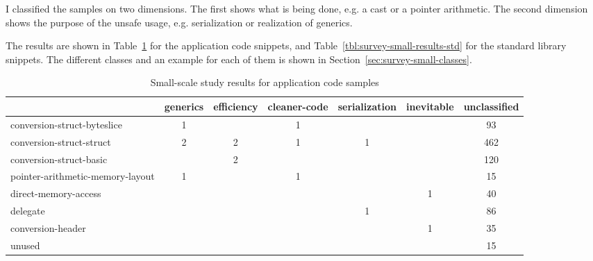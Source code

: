 I classified the samples on two dimensions.
The first shows what is being done, e.g. a cast or a pointer arithmetic.
The second dimension shows the purpose of the unsafe usage, e.g. serialization or realization of generics.

The results are shown in Table~\ref{tbl:survey-small-results-app} for the application code snippets, and
Table~\ref{tbl:survey-small-results-std} for the standard library snippets.
The different classes and an example for each of them is shown in Section~\ref{sec:survey-small-classes}.

\begin{table}[h]
    \centering
    \caption{Small-scale study results for application code samples}
    \label{tbl:survey-small-results-app}
    \begin{tabularx}{\textwidth}{Xcccccc}
        \toprule
                                          & generics & efficiency & cleaner-code & serialization & inevitable &  unclassified \\
        \midrule
              conversion-struct-byteslice &        1 &            &            1 &               &            &            93 \\
        \rowcolor{verylightgray}
                 conversion-struct-struct &        2 &          2 &            1 &             1 &            &           462 \\
                  conversion-struct-basic &          &          2 &              &               &            &           120 \\
        \rowcolor{verylightgray}
         pointer-arithmetic-memory-layout &        1 &            &            1 &               &            &            15 \\
                     direct-memory-access &          &            &              &               &          1 &            40 \\
        \rowcolor{verylightgray}
                                 delegate &          &            &              &             1 &            &            86 \\
                        conversion-header &          &            &              &               &          1 &            35 \\
        \rowcolor{verylightgray}
                                   unused &          &            &              &               &            &            15 \\

\end{tabularx}
\end{table}
